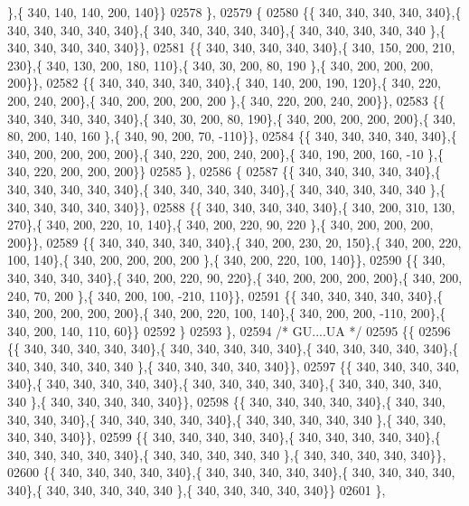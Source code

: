 \begin{DoxyCode}
      \},\{ 340, 140, 140, 200, 140\}\}
02578 \},
02579 \{
02580 \{\{ 340, 340, 340, 340, 340\},\{ 340, 340, 340, 340, 340\},\{ 340, 340, 340, 340, 340\},\{ 340, 340, 340, 340, 340
      \},\{ 340, 340, 340, 340, 340\}\},
02581 \{\{ 340, 340, 340, 340, 340\},\{ 340, 150, 200, 210, 230\},\{ 340, 130, 200, 180, 110\},\{ 340,  30, 200,  80, 190
      \},\{ 340, 200, 200, 200, 200\}\},
02582 \{\{ 340, 340, 340, 340, 340\},\{ 340, 140, 200, 190, 120\},\{ 340, 220, 200, 240, 200\},\{ 340, 200, 200, 200, 200
      \},\{ 340, 220, 200, 240, 200\}\},
02583 \{\{ 340, 340, 340, 340, 340\},\{ 340,  30, 200,  80, 190\},\{ 340, 200, 200, 200, 200\},\{ 340,  80, 200, 140, 160
      \},\{ 340,  90, 200,  70, -110\}\},
02584 \{\{ 340, 340, 340, 340, 340\},\{ 340, 200, 200, 200, 200\},\{ 340, 220, 200, 240, 200\},\{ 340, 190, 200, 160, -10
      \},\{ 340, 220, 200, 200, 200\}\}
02585 \},
02586 \{
02587 \{\{ 340, 340, 340, 340, 340\},\{ 340, 340, 340, 340, 340\},\{ 340, 340, 340, 340, 340\},\{ 340, 340, 340, 340, 340
      \},\{ 340, 340, 340, 340, 340\}\},
02588 \{\{ 340, 340, 340, 340, 340\},\{ 340, 200, 310, 130, 270\},\{ 340, 200, 220,  10, 140\},\{ 340, 200, 220,  90, 220
      \},\{ 340, 200, 200, 200, 200\}\},
02589 \{\{ 340, 340, 340, 340, 340\},\{ 340, 200, 230,  20, 150\},\{ 340, 200, 220, 100, 140\},\{ 340, 200, 200, 200, 200
      \},\{ 340, 200, 220, 100, 140\}\},
02590 \{\{ 340, 340, 340, 340, 340\},\{ 340, 200, 220,  90, 220\},\{ 340, 200, 200, 200, 200\},\{ 340, 200, 240,  70, 200
      \},\{ 340, 200, 100, -210, 110\}\},
02591 \{\{ 340, 340, 340, 340, 340\},\{ 340, 200, 200, 200, 200\},\{ 340, 200, 220, 100, 140\},\{ 340, 200, 200, -110, 
      200\},\{ 340, 200, 140, 110,  60\}\}
02592 \}
02593 \},
02594 \textcolor{comment}{/* GU....UA */}
02595 \{\{
02596 \{\{ 340, 340, 340, 340, 340\},\{ 340, 340, 340, 340, 340\},\{ 340, 340, 340, 340, 340\},\{ 340, 340, 340, 340, 340
      \},\{ 340, 340, 340, 340, 340\}\},
02597 \{\{ 340, 340, 340, 340, 340\},\{ 340, 340, 340, 340, 340\},\{ 340, 340, 340, 340, 340\},\{ 340, 340, 340, 340, 340
      \},\{ 340, 340, 340, 340, 340\}\},
02598 \{\{ 340, 340, 340, 340, 340\},\{ 340, 340, 340, 340, 340\},\{ 340, 340, 340, 340, 340\},\{ 340, 340, 340, 340, 340
      \},\{ 340, 340, 340, 340, 340\}\},
02599 \{\{ 340, 340, 340, 340, 340\},\{ 340, 340, 340, 340, 340\},\{ 340, 340, 340, 340, 340\},\{ 340, 340, 340, 340, 340
      \},\{ 340, 340, 340, 340, 340\}\},
02600 \{\{ 340, 340, 340, 340, 340\},\{ 340, 340, 340, 340, 340\},\{ 340, 340, 340, 340, 340\},\{ 340, 340, 340, 340, 340
      \},\{ 340, 340, 340, 340, 340\}\}
02601 \},

\end{DoxyCode}
